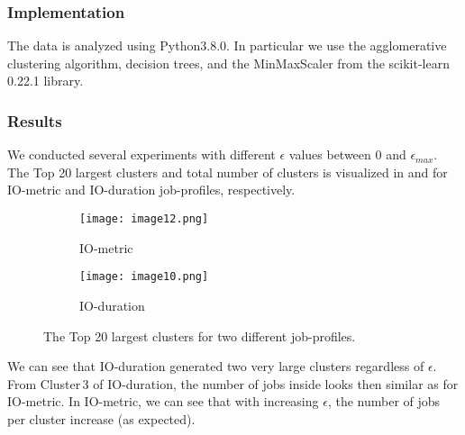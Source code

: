 \documentclass{jhps}
\makeatletter
\newcommand{\jk}[1]{\todo[inline]{JK:\@#1}}
\newcommand{\eb}[1]{\todo[inline, color=GreenYellow]{EB:\@#1}}
\makeatother
\begin{document}
\subsubsection{Implementation}
The data is analyzed using Python3.8.0.
In particular we use the agglomerative clustering algorithm, decision trees, and the MinMaxScaler from the scikit-learn 0.22.1 library.


\subsubsection{Results}
We conducted several experiments with different $\epsilon$ values between 0 and $\epsilon_{max}$.
The Top 20 largest clusters and total number of clusters is visualized in  and  for IO-metric and IO-duration job-profiles, respectively.

\begin{figure}
 \begin{subfigure}[t]{0.45\textwidth}
	\texttt{[image: image12.png]}
	\caption{IO-metric}
	\label{fig:datasets_clustering_results:io_metric}
 \end{subfigure}
 \hfill
	\begin{subfigure}[t]{0.45\textwidth}
	\texttt{[image: image10.png]}
	\caption{IO-duration}
	\label{fig:datasets_clustering_results:io_duration}
 \end{subfigure}

 \caption{The Top 20 largest clusters for two different job-profiles.}
 \label{fig:datasets_clustering_results}
\end{figure}


We can see that IO-duration generated two very large clusters regardless of $\epsilon$.
From Cluster\,3 of IO-duration, the number of jobs inside looks then similar as for IO-metric.
In IO-metric, we can see that with increasing $\epsilon$, the number of jobs per cluster increase (as expected).

\end{document}
